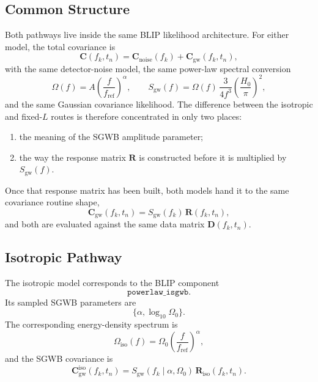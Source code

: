 \documentclass[11pt]{article}
\begin{document}
\subsection{Common Structure}
Both pathways live inside the same BLIP likelihood architecture. For either model, the total covariance is
\begin{equation}
\mathbf{C}(f_k,t_n)=\mathbf{C}_{\mathrm{noise}}(f_k)+\mathbf{C}_{\mathrm{gw}}(f_k,t_n),
\end{equation}
with the same detector-noise model, the same power-law spectral conversion
\begin{equation}
\Omega(f)=A\left(\frac{f}{f_{\mathrm{ref}}}\right)^\alpha,
\qquad
S_{\mathrm{gw}}(f)=\Omega(f)\,\frac{3}{4f^3}\left(\frac{H_0}{\pi}\right)^2,
\end{equation}
and the same Gaussian covariance likelihood. The difference between the isotropic and fixed-$L$ routes is therefore concentrated in only two places:
\begin{enumerate}
\item the meaning of the SGWB amplitude parameter;
\item the way the response matrix \(\mathbf{R}\) is constructed before it is multiplied by \(S_{\mathrm{gw}}(f)\).
\end{enumerate}
Once that response matrix has been built, both models hand it to the same covariance routine shape,
\begin{equation}
\mathbf{C}_{\mathrm{gw}}(f_k,t_n)=S_{\mathrm{gw}}(f_k)\,\mathbf{R}(f_k,t_n),
\end{equation}
and both are evaluated against the same data matrix \(\mathbf{D}(f_k,t_n)\).

\subsection{Isotropic Pathway}
The isotropic model corresponds to the BLIP component
\begin{equation}
\texttt{powerlaw\_isgwb}.
\end{equation}
Its sampled SGWB parameters are
\begin{equation}
\{\alpha,\log_{10}\Omega_0\}.
\end{equation}
The corresponding energy-density spectrum is
\begin{equation}
\Omega_{\mathrm{iso}}(f)=\Omega_0\left(\frac{f}{f_{\mathrm{ref}}}\right)^\alpha,
\end{equation}
and the SGWB covariance is
\begin{equation}
\mathbf{C}^{\mathrm{iso}}_{\mathrm{gw}}(f_k,t_n)
=S_{\mathrm{gw}}(f_k\mid \alpha,\Omega_0)\,
\mathbf{R}_{\mathrm{iso}}(f_k,t_n).
\end{equation}
\end{document}
